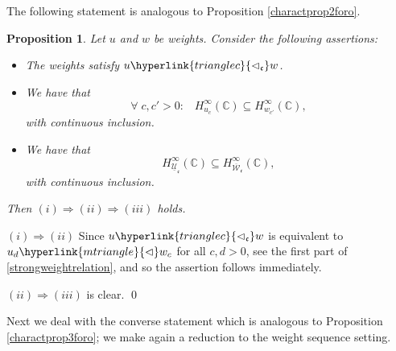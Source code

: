 \documentclass[10pt]{amsart}%
\numberwithin{equation}{section}
\theoremstyle{plain}
\newtheorem{proposition}{Proposition}[section]
\newcommand{\CC}{\mathbb{C}}
\begin{document}
The following statement is analogous to Proposition \ref{charactprop2foro}.

\begin{proposition}\label{mixedweightstrong}
	Let $u$ and $w$ be weights. Consider the following assertions:
	\begin{itemize}
		\item[$(i)$] The weights satisfy $u\hyperlink{trianglec}{\vartriangleleft_{\mathfrak{c}}}w$.
		
		\item[$(ii)$] We have that
		\begin{equation}\label{mixedweightstrongequ}
			\forall\;c,c'>0:\;\;\;H^{\infty}_{u_c}(\CC)\subseteq H^{\infty}_{w_{c'}}(\CC),
		\end{equation}
		with continuous inclusion.
		
		\item[$(iii)$] We have that
		$$H^{\infty}_{\underline{\mathcal{U}}_{\mathfrak{c}}}(\CC)\subseteq H^{\infty}_{\overline{\mathcal{W}}_{\mathfrak{c}}}(\CC),$$
		with continuous inclusion.
	\end{itemize}
	Then $(i)\Rightarrow(ii)\Rightarrow(iii)$ holds.
\end{proposition}

$(i)\Rightarrow(ii)$ Since $u\hyperlink{trianglec}{\vartriangleleft_{\mathfrak{c}}}w$ is equivalent to $u_d\hyperlink{mtriangle}{\vartriangleleft}w_c$ for all $c,d>0$, see the first part of \eqref{strongweightrelation}, and so the assertion follows immediately.

$(ii)\Rightarrow(iii)$ is clear.
\qed\enddemo

Next we deal with the converse statement which is analogous to Proposition \ref{charactprop3foro}; we make again a reduction to the weight sequence setting.
\end{document}
